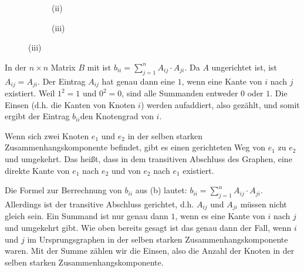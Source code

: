 \documentclass[11pt]{scrartcl}  %
\begin{document}
\begin{compactenum}[(a)]
\begin{figure}[h]
\begin{subfigure}{0.3\textwidth}
      \caption{(ii)}
    \end{subfigure}
    \begin{subfigure}{0.3\textwidth}
      \centering

      \caption{(iii)}
    \end{subfigure}
  \end{figure}

\item In der $n\times n$ Matrix $B$ mit  ist $b_{ii} = \sum_{j=1}^{n} A_{ij} \cdot A_{ji}$. Da $A$ ungerichtet ist, ist $A_{ij} = A_{ji}$. Der Eintrag $A_{ij}$ hat genau dann eine $1$, wenn eine Kante von $i$ nach $j$ existiert. Weil $1^2 = 1$ und $0^2 = 0$, sind alle Summanden entweder $0$ oder $1$. Die Einsen (d.h. die Kanten von Knoten $i$) werden aufaddiert, also gezählt, und somit ergibt der Eintrag $b_{ii}$den Knotengrad von $i$.

\item Wenn sich zwei Knoten $e_1$ und $e_2$ in der selben starken Zusammenhangskomponente befindet, gibt es einen gerichteten Weg von $e_1$ zu $e_2$ und umgekehrt. Das heißt, dass in dem transitiven Abschluss des Graphen, eine direkte Kante von $e_1$ nach $e_2$ und von $e_2$ nach $e_1$ existiert.

Die Formel zur Berrechnung von $b_{ii}$ aus (b) lautet: $b_{ii} = \sum_{j=1}^{n} A_{ij} \cdot A_{ji}$. Allerdings ist der transitive Abschluss gerichtet, d.h. $A_{ij}$ und $A_{ji}$ müssen nicht gleich sein. Ein Summand ist nur genau dann $1$, wenn es eine Kante von $i$ nach $j$ und umgekehrt gibt. Wie oben bereits gesagt ist das genau dann der Fall, wenn $i$ und $j$ im Ursprungsgraphen in der selben starken Zusammenhangskomponente waren. Mit der Summe zählen wir die Einsen, also die Anzahl der Knoten in der selben starken Zusammenhangskomponente.
\end{compactenum}


\newpage
\end{document}
